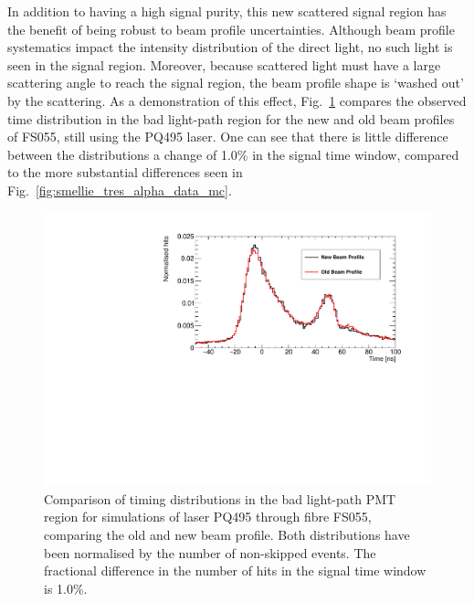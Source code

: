 In addition to having a high signal purity, this new scattered signal region has the benefit of being robust to beam profile uncertainties. Although beam profile systematics impact the intensity distribution of the direct light, no such light is seen in the signal region. Moreover, because scattered light must have a large scattering angle to reach the signal region, the beam profile shape is `washed out' by the scattering. As a demonstration of this effect, Fig.~\ref{fig:smellie_bad_lightpath_region_beamprofile_comparison} compares the observed time distribution in the bad light-path region for the new and old beam profiles of FS055, still using the PQ495 laser. One can see that there is little difference between the distributions a change of 1.0\% in the signal time window, compared to the more substantial differences seen in Fig.~\ref{fig:smellie_tres_alpha_data_mc}.

\begin{figure}
    \centering
    \includegraphics[width=\textwidth]{5_SMELLIEAnalysis/images/FS055_PQ495_new_vs_old_beam_profile_bad_lightpath_timeplot.pdf}
    \caption[Comparison of timing distributions in the bad light-path PMT region for simulations of laser PQ495 through fibre FS055, comparing the old and new beam profile]
    {Comparison of timing distributions in the bad light-path PMT region for simulations of laser PQ495 through fibre FS055, comparing the old and new beam profile. Both distributions have been normalised by the number of non-skipped events. The fractional difference in the number of hits in the signal time window is 1.0\%.}
    \label{fig:smellie_bad_lightpath_region_beamprofile_comparison}
\end{figure}


